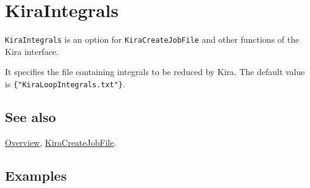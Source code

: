 \documentclass[../FeynHelpersManual.tex]{subfiles}
\begin{document}
\hypertarget{kiraintegrals}{
\section{KiraIntegrals}\label{kiraintegrals}}

\texttt{KiraIntegrals} is an option for \texttt{KiraCreateJobFile} and
other functions of the Kira interface.

It specifies the file containing integrals to be reduced by Kira. The
default value is \texttt{\{\allowbreak{}"KiraLoopIntegrals.txt"\}}.

\subsection{See also}

\hyperlink{toc}{Overview},
\hyperlink{kiracreatejobfile}{KiraCreateJobFile}.

\subsection{Examples}
\end{document}
